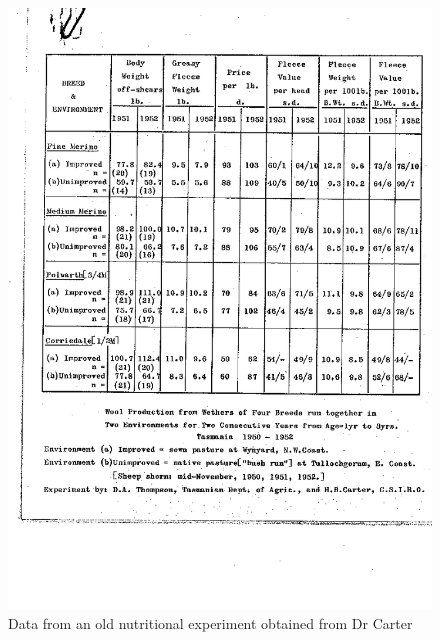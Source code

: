 %

\begin{figure}[h]
  \centering
   \includegraphics[width=1.1\textwidth]{carter51c.png}
  \caption{Data from an old nutritional experiment obtained from Dr Carter}
  \label{fig:thomcart3}
\end{figure}

%

